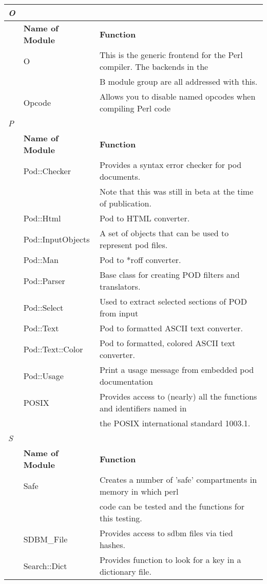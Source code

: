 \documentclass[a4paper,11pt]{book}
\begin{document}
\begin{tabular}{|p{0.3in}|p{1.1in}|p{2.9in}|} \hline 
\newline \textit{O} &  &  \\ \hline 
 & \textbf{Name of Module} & \textbf{Function} \\ \hline 
 & O & This is the generic frontend for the Perl compiler. The backends in the \\ \hline 
 &  & B module group are all addressed with this. \\ \hline 
 & Opcode & Allows you to disable named opcodes when compiling Perl code \\ \hline 
\newline \textit{P} &  &  \\ \hline 
 & \textbf{Name of Module} & \textbf{Function} \\ \hline 
 & Pod::Checker & Provides a syntax error checker for pod documents. \\ \hline 
 &  & Note that this was still in beta at the time of publication. \\ \hline 
 & Pod::Html & Pod to HTML converter. \\ \hline 
 & Pod::InputObjects & A set of objects that can be used to represent pod files. \\ \hline 
 & Pod::Man & Pod to *roff converter. \\ \hline 
 & Pod::Parser & Base class for creating POD filters and translators. \\ \hline 
 & Pod::Select & Used to extract selected sections of POD from input \\ \hline 
 & Pod::Text & Pod to formatted ASCII text converter. \\ \hline 
 & Pod::Text::Color & Pod to formatted, colored ASCII text converter. \\ \hline 
 & Pod::Usage & Print a usage message from embedded pod documentation \\ \hline 
 & POSIX & Provides access to (nearly) all the functions and identifiers named in \\ \hline 
 &  & the POSIX international standard 1003.1. \\ \hline 
\newline \textit{S} &  &  \\ \hline 
 & \textbf{Name of Module} & \textbf{Function} \\ \hline 
 & Safe & Creates a number of 'safe' compartments in memory in which perl \\ \hline 
 &  & code can be tested and the functions for this testing. \\ \hline 
 & SDBM\_File & Provides access to sdbm files via tied hashes. \\ \hline 
 & Search::Dict & Provides function to look for a key in a dictionary file. \\ \hline 
\end{tabular}
\end{document}
